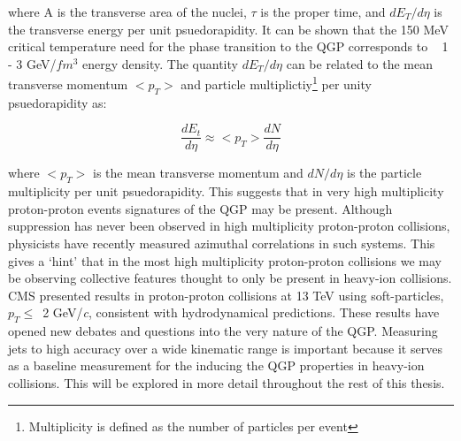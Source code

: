 \noindent
where A is the transverse area of the nuclei, $\tau$ is the proper time, and $dE_{T}/d \eta$ is the transverse energy per unit psuedorapidity.  It can be shown that  the 150 MeV critical temperature need for the phase transition to the QGP corresponds to ~ 1 - 3 GeV/$fm^{3}$ energy density.  The quantity $dE_{T}/d \eta$ can be related to the mean transverse momentum $<p_{T}>$ and particle multiplictiy\footnote{Multiplicity is defined as the number of particles per event} per unity psuedorapidity as:

\begin{equation}
\frac{dE_{t}}{d \eta}  \approx  <p_{T}> \frac{dN}{d\eta}
\label{eq:Et}
\end{equation}

where $ <p_{T} >$ is the mean transverse momentum and $dN/d\eta$ is the particle multiplicity per unit psuedorapidity.  This suggests that in very high multiplicity proton-proton events signatures of the QGP may be present.  Although suppression has never been observed in high multiplicity proton-proton collisions, physicists have recently measured azimuthal correlations in such systems\cite{Nagle:2018nvi}.  This gives a `hint' that in the most high multiplicity proton-proton collisions we may be observing collective features thought to only be present in heavy-ion collisions.  CMS presented results in proton-proton collisions at 13 TeV using soft-particles, $p_{T} \leq\,$ 2 GeV/\textit{c}, consistent with hydrodynamical predictions\cite{ZHAO2018495}. These results have opened new debates and questions into the very nature of the QGP.  Measuring jets to high accuracy over a wide kinematic range is important because it serves as a baseline measurement for the inducing the QGP properties in heavy-ion collisions.  This will be explored in more detail throughout the rest of this thesis.